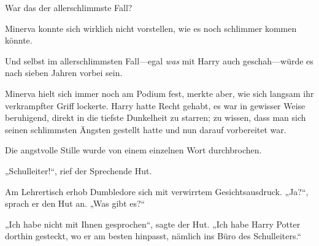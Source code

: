 War das der allerschlimmste Fall?

Minerva konnte sich wirklich nicht vorstellen, wie es noch schlimmer kommen könnte.

Und selbst im allerschlimmsten Fall—egal \emph{was} mit Harry auch geschah—würde es nach sieben Jahren vorbei sein.

Minerva hielt sich immer noch am Podium fest, merkte aber, wie sich langsam ihr verkrampfter Griff lockerte. Harry hatte Recht gehabt, es war in gewisser Weise beruhigend, direkt in die tiefste Dunkelheit zu starren; zu wissen, dass man sich seinen schlimmsten Ängsten gestellt hatte und nun darauf vorbereitet war.

Die angstvolle Stille wurde von einem einzelnen Wort durchbrochen.

„Schulleiter!“, rief der Sprechende Hut.

Am Lehrertisch erhob Dumbledore sich mit verwirrtem Gesichtsausdruck. „Ja?“, sprach er den Hut an. „Was gibt es?“

„Ich habe nicht mit Ihnen gesprochen“, sagte der Hut. „Ich habe Harry Potter dorthin gesteckt, wo er am besten hinpasst, nämlich ins Büro des Schulleiters.“

